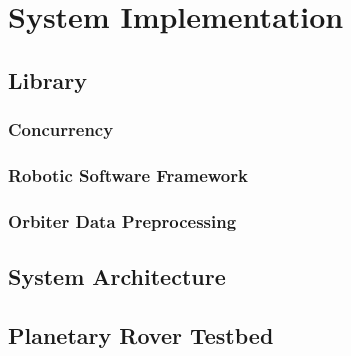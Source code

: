 \label{Chapter3}

\chapter{System Implementation}

\section{Library}

\subsection{Concurrency}

\subsection{Robotic Software Framework}

\subsection{Orbiter Data Preprocessing}

\section{System Architecture}

\section{Planetary Rover Testbed}

